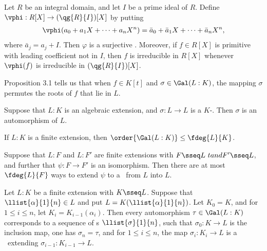 \documentclass[a4paper]{article}
\begin{document}
\begin{ttheorem}
  Let \( R \) be an integral domain, and let \( I \) be a prime ideal of \( R \).
  Define \( \vphi:R[X]\to (\qg{R}{I})[X] \) by putting \begin{align*}
    \vphi(a_0+a_1X+\cdots+a_nX^n) =\bar a_0+\bar a_1X+\cdots+\bar a_nX^n,
  \end{align*}
  where \( \bar a_j = a_j + I \).
  Then \( \varphi \) is a surjective \homo.
  Moreover, if \( f\in R[X] \) is primitive with leading coefficient not in \( I \), then \( f \) is irreducible in \( R[X] \) whenever \( \vphi(f) \) is irreducible in \( (\qg{R}{I})[X] \).
\end{ttheorem}

\quad Proposition 3.1 tells us that when \( f\in K[t] \) and \( \sigma\in \Gal(L:K) \), the mapping \( \sigma \) permutes the roots of \( f \) that lie in \( L \).

\begin{ttheorem}
  Suppose that \( L:K \) is an algebraic extension, and \( \sigma:L\to L \) is a \( K \)-\homo.
  Then \( \sigma \) is an automorphism of \( L \).
\end{ttheorem}

\begin{ttheorem}
  If \( L:K \) is a finite extension, then \( \order{\Gal(L:K)}\leq \fdeg{L}{K} \).
\end{ttheorem}

\begin{tcorollary}
  Suppose that \( L:F \) and \( L:F' \) are finite extensions with \( F\sseq L\ tand F'\sseq L \), and further that \( \psi:F\to F' \) is an isomorphism.
  Then there are at most \( \fdeg{L}{F} \) ways to extend \( \psi \) to a \homo~from \( L \) into \( L \).
\end{tcorollary}

\begin{tcorollary}
  Let \( L:K \) be a finite extension with \( K\sseq L \).
  Suppose that \( \llist{\alpha}{1}{n}\in L \) and put \( L=K(\llist{\alpha}{1}{n}) \).
  Let \( K_0 = K \), and for \( 1\leq i\leq n \), let \( K_i = K_{i-1}(\alpha_i) \).
  Then every automorphism \( \tau \in \Gal(L:K) \) corresponds to a sequence of \homo s \( \llist{\sigma}{1}{n} \), such that \( \sigma_0:K\to L \) is the inclusion map, one has \( \sigma_n=\tau \), and for \( 1\leq i\leq n \), the map \( \sigma_i : K_i\to L \) is a \homo~extending \( \sigma_{i-1}:K_{i-1}\to L \).
\end{tcorollary}
\end{document}
